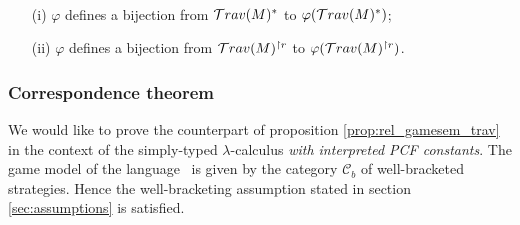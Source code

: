 \begin{cor} \
\label{cor:SIGMACONST:varphi_bij}
\begin{itemize}
\item[(i)] $\varphi$ defines a bijection from $\mathcal{T}rav(M)^*$
to $\varphi(\mathcal{T}rav(M)^*)$;
\item[(ii)] $\varphi$ defines a bijection from $\mathcal{T}rav(M)^{\upharpoonright r}$ to
$\varphi(\mathcal{T}rav(M)^{\upharpoonright r})$.
\end{itemize}
\end{cor}


\subsubsection{Correspondence theorem}
We would like to prove the counterpart of proposition
\ref{prop:rel_gamesem_trav} in the context of the simply-typed
$\lambda$-calculus \emph{with interpreted PCF constants}. The game
model of the language \pcf\ is given by the category $\mathcal{C}_b$
of well-bracketed strategies. Hence the well-bracketing assumption
stated in section \ref{sec:assumptions} is satisfied.

